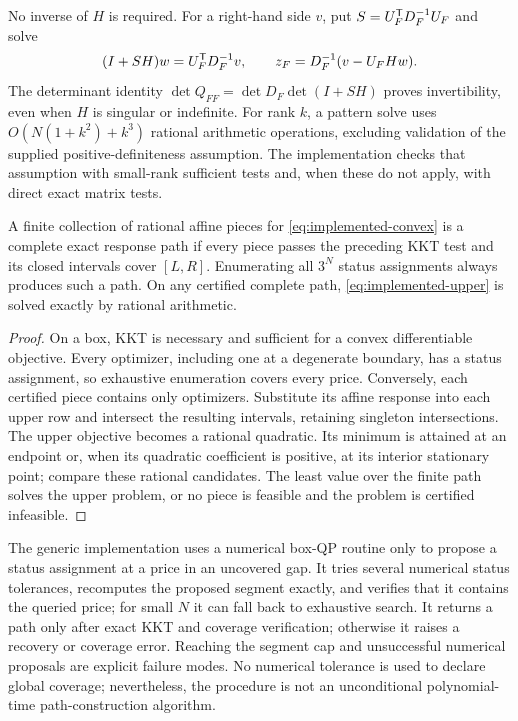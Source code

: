 No inverse of $H$ is required. For a right-hand side $v$, put
$S=U_F^{\mathsf T} D_F^{-1}U_F$ and solve
\[
 (I+SH)w=U_F^{\mathsf T} D_F^{-1}v,
 \qquad z_F=D_F^{-1}(v-U_FHw).
\]
The determinant identity
$\det Q_{FF}=\det D_F\det(I+SH)$ proves invertibility, even when $H$ is singular
or indefinite. For rank $k$, a pattern solve uses
$O(N(1+k^2)+k^3)$ rational arithmetic operations, excluding validation of the
supplied positive-definiteness assumption. The implementation checks that
assumption with small-rank sufficient tests and, when these do not apply, with
direct exact matrix tests.

\begin{proposition}
\label{prop:convex-certified-path}
A finite collection of rational affine pieces for \eqref{eq:implemented-convex}
is a complete exact response path if every piece passes the preceding KKT test
and its closed intervals cover $[L,R]$. Enumerating all $3^N$ status assignments
always produces such a path. On any certified complete path,
\eqref{eq:implemented-upper} is solved exactly by rational arithmetic.
\end{proposition}
\begin{proof}
On a box, KKT is necessary and sufficient for a convex differentiable
objective. Every optimizer, including one at a degenerate boundary, has a
status assignment, so exhaustive enumeration covers every price. Conversely,
each certified piece contains only optimizers. Substitute its affine response
into each upper row and intersect the resulting intervals, retaining singleton
intersections. The upper objective becomes a rational quadratic. Its minimum is
attained at an endpoint or, when its quadratic coefficient is positive, at its
interior stationary point; compare these rational candidates. The least value
over the finite path solves the upper problem, or no piece is feasible and the
problem is certified infeasible.
\end{proof}

The generic implementation uses a numerical box-QP routine only to propose a
status assignment at a price in an uncovered gap. It tries several numerical
status tolerances, recomputes the proposed segment exactly, and verifies that
it contains the queried price; for small $N$ it can fall back to exhaustive
search. It returns a path only after exact KKT and coverage verification;
otherwise it raises a recovery or coverage error. Reaching the segment cap and
unsuccessful numerical proposals are explicit failure modes. No numerical
tolerance is used to declare global coverage; nevertheless, the procedure is not an unconditional
polynomial-time path-construction algorithm.

